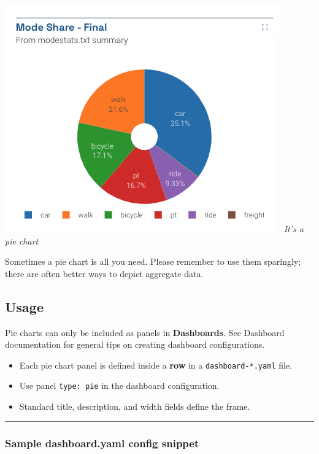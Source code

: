 \includegraphics{assets/pie.png} \emph{It's a pie chart}

Sometimes a pie chart is all you need. Please remember to use them
sparingly; there are often better ways to depict aggregate data.

\hypertarget{usage}{%
\subsection{Usage}\label{usage}}

Pie charts can only be included as panels in \textbf{Dashboards}. See
Dashboard documentation for general tips on creating dashboard
configurations.

\begin{itemize}
\tightlist
\item
  Each pie chart panel is defined inside a \textbf{row} in a
  \texttt{dashboard-*.yaml} file.
\item
  Use panel \texttt{type:\ pie} in the dashboard configuration.
\item
  Standard title, description, and width fields define the frame.
\end{itemize}

\begin{center}\rule{0.5\linewidth}{0.5pt}\end{center}

\hypertarget{sample-dashboard.yaml-config-snippet}{%
\subsubsection{Sample dashboard.yaml config
snippet}\label{sample-dashboard.yaml-config-snippet}}

